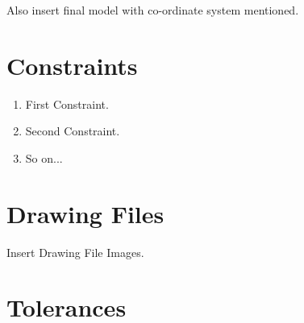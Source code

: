 \documentclass[12pt, a4paper, oneside]{book}
\begin{document}
Also insert final model with co-ordinate system mentioned.

\chapter{Constraints }

\begin{enumerate}
  \item First Constraint.
  \item Second Constraint.
  \item So on...
\end{enumerate}

\chapter{Drawing Files}
Insert Drawing File Images.

\chapter{Tolerances}
\end{document}
